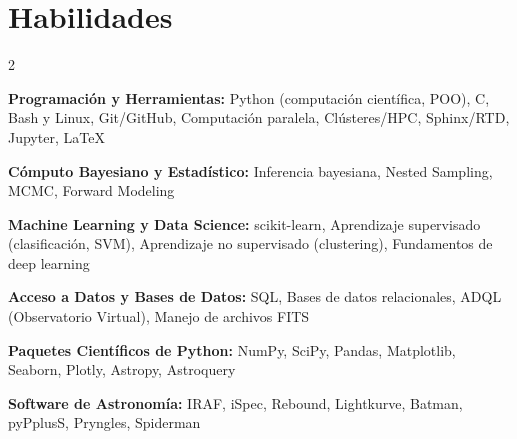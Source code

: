 \section*{Habilidades}
\begin{multicols}{2}

\textbf{Programación y Herramientas:}
Python (computación científica, POO), C, Bash y Linux, Git/GitHub, Computación paralela, Clústeres/HPC, Sphinx/RTD, Jupyter, LaTeX

\textbf{Cómputo Bayesiano y Estadístico:}
Inferencia bayesiana, Nested Sampling, MCMC, Forward Modeling

\textbf{Machine Learning y Data Science:}
scikit-learn, Aprendizaje supervisado (clasificación, SVM), Aprendizaje no supervisado (clustering), Fundamentos de deep learning

\textbf{Acceso a Datos y Bases de Datos:}
SQL, Bases de datos relacionales, ADQL (Observatorio Virtual), Manejo de archivos FITS

\textbf{Paquetes Científicos de Python:}
NumPy, SciPy, Pandas, Matplotlib, Seaborn, Plotly, Astropy, Astroquery

\textbf{Software de Astronomía:}
IRAF, iSpec, Rebound, Lightkurve, Batman, pyPplusS, Pryngles, Spiderman

\end{multicols}
